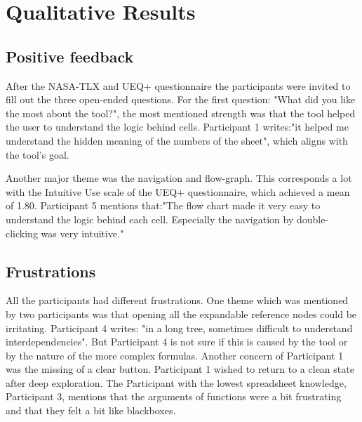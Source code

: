 \section{Qualitative Results}
\subsection{Positive feedback}
After the NASA-TLX and UEQ+ questionnaire the participants were invited to fill out the three open-ended questions. For the first question: "What did you like the most about the tool?", the most mentioned strength was that the tool helped the user to understand the logic behind cells. Participant 1 writes:"it helped me understand the hidden meaning of the numbers of the sheet", which aligns with the tool's goal.

Another major theme was the navigation and flow-graph. This corresponds a lot with the Intuitive Use scale of the UEQ+ questionnaire, which achieved a mean of 1.80. Participant 5 mentions that:"The flow chart made it very easy to understand the logic behind each cell. Especially the navigation by double-clicking was very intuitive."

\subsection{Frustrations}
All the participants had different frustrations. One theme which was mentioned by two participants was that opening all the expandable reference nodes could be irritating. Participant 4 writes: "in a long tree, sometimes difficult to understand interdependencies". But Participant 4 is not sure if this is caused by the tool or by the nature of the more complex formulas.
Another concern of Participant 1 was the missing of a clear button. Participant 1 wished to return to a clean state after deep exploration. The Participant with the lowest spreadsheet knowledge, Participant 3, mentions that the arguments of functions were a bit frustrating and that they felt a bit like blackboxes.

